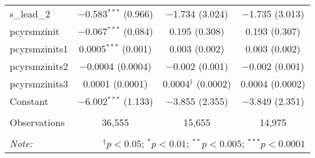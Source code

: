 \begin{table}[!htbp]
\begin{tabular}{@{\extracolsep{5pt}}lccc}
  s\_lead\_2 & $-$0.583$^{***}$ (0.966) & $-$1.734 (3.024) & $-$1.735 (3.013) \\ 
  pcyrsmzinit & $-$0.067$^{***}$ (0.084) & 0.195 (0.308) & 0.193 (0.307) \\ 
  pcyrsmzinits1 & 0.0005$^{***}$ (0.001) & 0.003 (0.002) & 0.003 (0.002) \\ 
  pcyrsmzinits2 & $-$0.0004 (0.0004) & $-$0.002 (0.001) & $-$0.002 (0.001) \\ 
  pcyrsmzinits3 & 0.0001 (0.0001) & 0.0004$^{\dagger}$ (0.0002) & 0.0004 (0.0002) \\ 
  Constant & $-$6.002$^{***}$ (1.133) & $-$3.855 (2.355) & $-$3.849 (2.351) \\ 
 \hline \\[-1.8ex] 
Observations & 36,555 & 15,655 & 14,975 \\ 
\hline 
\hline \\[-1.8ex] 
\textit{Note:}  & \multicolumn{3}{r}{$^{\dagger} p<0.05$; $^{*} p<0.01$; $^{**} p<0.005$; $^{***} p<0.0001$} \\ 
\end{tabular} 
\end{table} 

